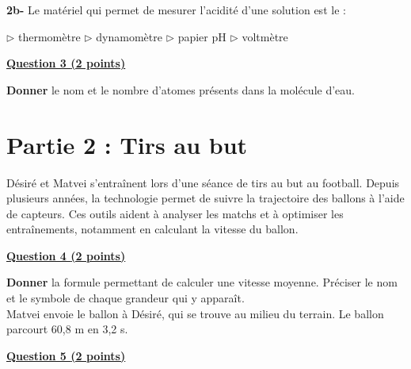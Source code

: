 \documentclass[12pt,a4paper]{article}
\newcommand{\question}[1]{\par\medskip\noindent\underline{\textbf{#1}}\par\smallskip}
\newcommand{\sousq}[2]{\par\noindent\textbf{#1-} #2\par\smallskip}
\newcommand{\pts}[1]{\textbf{(#1 points)}}
\begin{document}
\vspace{0.4cm}

\sousq{2b}{Le matériel qui permet de mesurer l’acidité d’une solution est le :}
\begin{center}
  $\triangleright$ thermomètre
  \hspace{2cm}
  $\triangleright$ dynamomètre
  \hspace{2cm}
  $\triangleright$ papier pH
  \hspace{2cm}
  $\triangleright$ voltmètre
\end{center}

\vspace{0.4cm}

\question{Question 3 \pts{2}}

\vspace{0.4cm}

\noindent
\textbf{Donner} le nom et le nombre d’atomes présents dans la molécule d'eau.


\newpage

\section*{Partie 2 : Tirs au but}

\noindent
Désiré et Matvei s'entraînent lors d'une séance de tirs au but au football. Depuis plusieurs années, la technologie permet de suivre la trajectoire des ballons à l'aide de capteurs. Ces outils aident à analyser les matchs et à optimiser les entraînements, notamment en calculant la vitesse du ballon.

\vspace{0.4cm}

\question{Question 4 \pts{2}}

\vspace{0.4cm}

\noindent
\textbf{Donner} la formule permettant de calculer une vitesse moyenne. Préciser le nom et le symbole de chaque grandeur qui y apparaît.\\[0.4cm]
Matvei envoie le ballon à Désiré, qui se trouve au milieu du terrain. Le ballon parcourt 60,8 m en 3,2 s.

\vspace{0.4cm}

\question{Question 5 \pts{2}}
\end{document}
